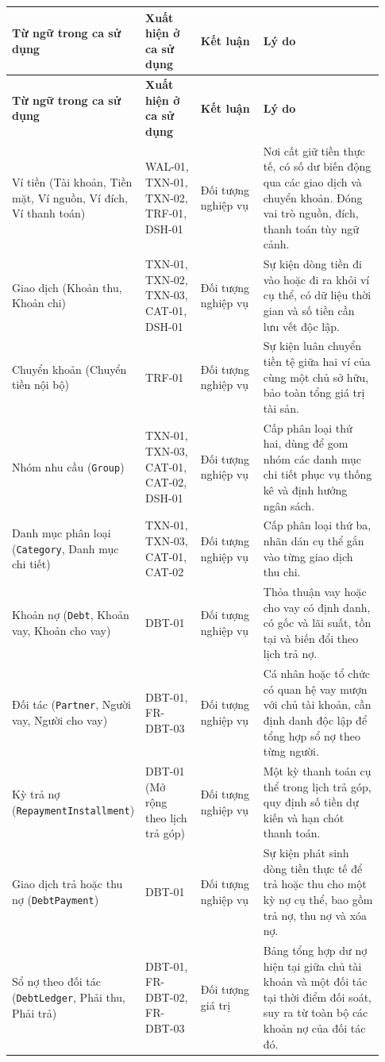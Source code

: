 \documentclass[11pt,a4paper]{article}
\newcommand{\code}[1]{\texttt{#1}}
\newcommand{\lthead}[1]{%
  \hline#1\\\hline\endfirsthead
  \hline#1\\\hline\endhead
}
\newenvironment{smalltable}{\begingroup\footnotesize\renewcommand{\arraystretch}{1.25}\setlength{\tabcolsep}{3pt}}{\endgroup}
\begin{document}
\begin{smalltable}
\begin{longtable}{|L{0.28\linewidth}|L{0.15\linewidth}|L{0.17\linewidth}|L{0.33\linewidth}|}
\lthead{\textbf{Từ ngữ trong ca sử dụng} & \textbf{Xuất hiện ở ca sử dụng} & \textbf{Kết luận} & \textbf{Lý do}}
Ví tiền (Tài khoản, Tiền mặt, Ví nguồn, Ví đích, Ví thanh toán) & WAL-01, TXN-01, TXN-02, TRF-01, DSH-01 & Đối tượng nghiệp vụ & Nơi cất giữ tiền thực tế, có số dư biến động qua các giao dịch và chuyển khoản. Đóng vai trò nguồn, đích, thanh toán tùy ngữ cảnh. \\ \hline
Giao dịch (Khoản thu, Khoản chi) & TXN-01, TXN-02, TXN-03, CAT-01, DSH-01 & Đối tượng nghiệp vụ & Sự kiện dòng tiền đi vào hoặc đi ra khỏi ví cụ thể, có dữ liệu thời gian và số tiền cần lưu vết độc lập. \\ \hline
Chuyển khoản (Chuyển tiền nội bộ) & TRF-01 & Đối tượng nghiệp vụ & Sự kiện luân chuyển tiền tệ giữa hai ví của cùng một chủ sở hữu, bảo toàn tổng giá trị tài sản. \\ \hline
Nhóm nhu cầu (\code{Group}) & TXN-01, TXN-03, CAT-01, CAT-02, DSH-01 & Đối tượng nghiệp vụ & Cấp phân loại thứ hai, dùng để gom nhóm các danh mục chi tiết phục vụ thống kê và định hướng ngân sách. \\ \hline
Danh mục phân loại (\code{Category}, Danh mục chi tiết) & TXN-01, TXN-03, CAT-01, CAT-02 & Đối tượng nghiệp vụ & Cấp phân loại thứ ba, nhãn dán cụ thể gắn vào từng giao dịch thu chi. \\ \hline
Khoản nợ (\code{Debt}, Khoản vay, Khoản cho vay) & DBT-01 & Đối tượng nghiệp vụ & Thỏa thuận vay hoặc cho vay có định danh, có gốc và lãi suất, tồn tại và biến đổi theo lịch trả nợ. \\ \hline
Đối tác (\code{Partner}, Người vay, Người cho vay) & DBT-01, FR-DBT-03 & Đối tượng nghiệp vụ & Cá nhân hoặc tổ chức có quan hệ vay mượn với chủ tài khoản, cần định danh độc lập để tổng hợp sổ nợ theo từng người. \\ \hline
Kỳ trả nợ (\code{RepaymentInstallment}) & DBT-01 (Mở rộng theo lịch trả góp) & Đối tượng nghiệp vụ & Một kỳ thanh toán cụ thể trong lịch trả góp, quy định số tiền dự kiến và hạn chót thanh toán. \\ \hline
Giao dịch trả hoặc thu nợ (\code{DebtPayment}) & DBT-01 & Đối tượng nghiệp vụ & Sự kiện phát sinh dòng tiền thực tế để trả hoặc thu cho một kỳ nợ cụ thể, bao gồm trả nợ, thu nợ và xóa nợ. \\ \hline
Sổ nợ theo đối tác (\code{DebtLedger}, Phải thu, Phải trả) & DBT-01, FR-DBT-02, FR-DBT-03 & Đối tượng giá trị & Bảng tổng hợp dư nợ hiện tại giữa chủ tài khoản và một đối tác tại thời điểm đối soát, suy ra từ toàn bộ các khoản nợ của đối tác đó. \\ \hline

\end{longtable}
\end{smalltable}
\end{document}
